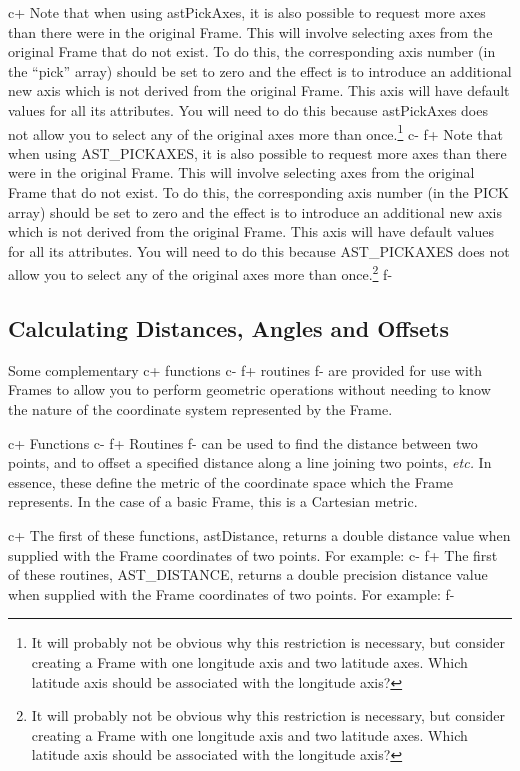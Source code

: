 \documentclass[twoside,11pt]{article}
\begin{document}
c+
Note that when using astPickAxes, it is also possible to request more
axes than there were in the original Frame. This will involve
selecting axes from the original Frame that do not exist. To do this,
the corresponding axis number (in the ``pick'' array) should be set to
zero and the effect is to introduce an additional new axis which is
not derived from the original Frame. This axis will have default
values for all its attributes. You will need to do this because
astPickAxes does not allow you to select any of the original axes more
than once.\footnote{It will probably not be obvious why this
restriction is necessary, but consider creating a Frame with one
longitude axis and two latitude axes. Which latitude axis should be
associated with the longitude axis?}
c-
f+
Note that when using AST\_PICKAXES, it is also possible to request
more axes than there were in the original Frame. This will involve
selecting axes from the original Frame that do not exist. To do this,
the corresponding axis number (in the PICK array) should be set to
zero and the effect is to introduce an additional new axis which is
not derived from the original Frame. This axis will have default
values for all its attributes. You will need to do this because
AST\_PICKAXES does not allow you to select any of the original axes
more than once.\footnote{It will probably not be obvious why this
restriction is necessary, but consider creating a Frame with one
longitude axis and two latitude axes. Which latitude axis should be
associated with the longitude axis?}
f-

\subsection{\label{ss:distanceandoffset}Calculating Distances, Angles and Offsets}
Some complementary 
c+
functions 
c-
f+
routines 
f-
are provided for use with Frames to allow you to perform geometric
operations without needing to know the nature of the coordinate system
represented by the Frame.

c+
Functions 
c-
f+
Routines 
f-
can be used to find the distance between two points, and to offset a 
specified distance along a line joining two points, {\em{etc.}} In essence, 
these define the metric of the coordinate space which the Frame represents. In
the case of a basic Frame, this is a Cartesian metric.

c+
The first of these functions, astDistance, returns a double distance
value when supplied with the Frame coordinates of two points. For
example:
c-
f+
The first of these routines, AST\_DISTANCE, returns a double precision
distance value when supplied with the Frame coordinates of two
points. For example:
f-
\end{document}
